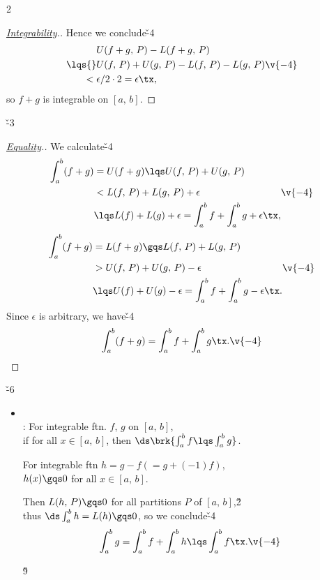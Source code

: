 \documentclass[dvipdfmx,a4paper,titlepage,9pt]{jsarticle}
\begin{document}
\begin{multicols*}{2}
\begin{itemize}[label={-}]
\begin{pfbox}
\begin{proof}[\color{TGreen}\ul{Integrability}.]
Hence we conclude\v{-4}
$$\begin{aligned}
&U(f+g,\,P)-L(f+g,\,P)\\
\lqs{}&U(f,\,P)+U(g,\,P)-L(f,\,P)-L(g,\,P)\\
<{}&\epsilon/2\cdot2=\epsilon\tx,
\end{aligned}\v{-4}$$
so $f+g$ is integrable on $[a,\,b]$.
\end{proof}\v{-3}

\dotfill

\begin{proof}[\color{TGreen}\ul{Equality}.]
We calculate\v{-4}
$$\begin{aligned}\int_a^b(f+g)&=U(f+g)\lqs U(f,\,P)+U(g,\,P)\\
&<L(f,\,P)+L(g,\,P)+\epsilon\\
&\lqs L(f)+L(g)+\epsilon=\int_a^bf+\int_a^bg+\epsilon\tx,\end{aligned}\v{-4}$$
$$\begin{aligned}\int_a^b(f+g)&=L(f+g)\gqs L(f,\,P)+L(g,\,P)\\
&>U(f,\,P)+U(g,\,P)-\epsilon\\
&\lqs U(f)+U(g)-\epsilon=\int_a^bf+\int_a^bg-\epsilon\tx.
\end{aligned}\v{-4}$$
Since $\epsilon$ is arbitrary, we have\v{-4}
$$\int_a^b(f+g)=\int_a^bf+\int_a^bg\tx.\v{-4}$$
\end{proof}
\end{pfbox}
\end{itemize}

\vfill\null\columnbreak

\v{-6}
\begin{itemize}[label={-}]
\item{}\\
: For integrable ftn. $f$, $g$ on $[a,\,b]$,\\
\;\;if  for all $x\in[a,\,b]$, then $\ds\brk{\int_a^bf\lqs\int_a^bg}$.

\begin{Pfbox}
For integrable ftn $h=g-f{}(=g+(-1)f)$,\\
$h(x)\gqs0$ for all $x\in[a,\,b]$.

Then $L(h,\,P)\gqs0$ for all partitions $P$ of $[a,\,b]$,\v2\\
thus $\ds\int_a^bh=L(h)\gqs0$, so we conclude\v{-4}
$$\int_a^bg=\int_a^bf+\int_a^bh\lqs\int_a^bf\tx.\v{-4}$$
\end{Pfbox}\v9


\end{itemize}
\end{multicols*}
\end{document}
